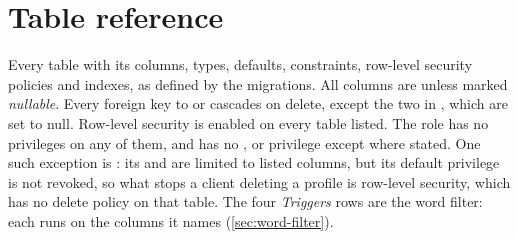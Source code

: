 \chapter{Table reference}
\label{app:tables}

Every table with its columns, types, defaults, constraints, row-level security policies and indexes, as
defined by the migrations. All columns are  unless marked \emph{nullable}. Every foreign key
to  or  cascades on delete, except the two in , which are set
to null. Row-level security is enabled on every table
listed. The role  has no privileges on any of them, and  has no
,  or  privilege except where stated. One such exception is
: its  and  are limited to listed columns, but its default
 privilege is not revoked, so what stops a client deleting a profile is row-level security,
which has no delete policy on that table. The four \emph{Triggers} rows are the word filter: each runs
 on the columns it names (\cref{sec:word-filter}).

\newcommand{\tablehead}[1]{%
  \multicolumn{2}{@{}l}{\textsf{\textbf{#1}}}\\[1pt]}


